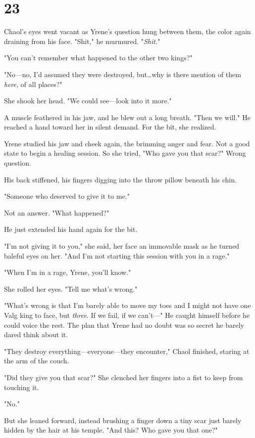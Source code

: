 
\chapter{23}

Chaol's eyes went vacant as Yrene's question hung between them, the color again draining from his face.
"Shit," he murmured.
"\emph{Shit.}"

"You can't remember what happened to the other two kings?"

"No---no, I'd assumed they were destroyed, but\ldots why is there mention of them \emph{here}, of all places?"

She shook her head.
"We could see---look into it more."

A muscle feathered in his jaw, and he blew out a long breath.
"Then we will."
He reached a hand toward her in silent demand.
For the bit, she realized.

Yrene studied his jaw and cheek again, the brimming anger and fear.
Not a good state to begin a healing session.
So she tried, "Who gave you that scar?"
Wrong question.

His back stiffened, his fingers digging into the throw pillow beneath his chin.

"Someone who deserved to give it to me."

Not an answer.
"What happened?"

He just extended his hand again for the bit.

"I'm not giving it to you," she said, her face an immovable mask as he turned baleful eyes on her.
"And I'm not starting this session with you in a rage."

"When I'm in a rage, Yrene, you'll know."

She rolled her eyes.
"Tell me what's wrong."

"What's wrong is that I'm barely able to move my toes and I might not have one Valg king to face, but \emph{three}.
If we fail, if we can't---" He caught himself before he could voice the rest.
The plan that Yrene had no doubt was so secret he barely dared think about it.

"They destroy everything---everyone---they encounter," Chaol finished, staring at the arm of the couch.

"Did they give you that scar?"
She clenched her fingers into a fist to keep from touching it.

"No."

But she leaned forward, instead brushing a finger down a tiny scar just barely hidden by the hair at his temple.
"And this?
Who gave you that one?"

